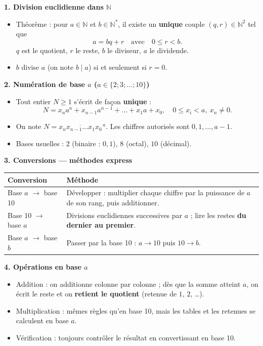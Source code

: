 \documentclass[11pt]{article}
\newcommand{\cle}[1]{{\popxbold\color{popdark}#1}}
\begin{document}
\begin{bilan}
\textbf{1. Division euclidienne dans $\mathbb{N}$}
\begin{itemize}
  \item \cle{Théorème} : pour $a\in\mathbb{N}$ et $b\in\mathbb{N}^*$, il existe un \textbf{unique} couple $(q,r)\in\mathbb{N}^2$ tel que
  \[ a=bq+r \quad\text{avec}\quad 0\leq r<b. \]
  $q$ est le \cle{quotient}, $r$ le \cle{reste}, $b$ le diviseur, $a$ le dividende.
  \item $b$ divise $a$ (on note $b\mid a$) si et seulement si $r=0$.
\end{itemize}

\textbf{2. Numération de base $a$ ($a\in\{2;3;\dots;10\}$)}
\begin{itemize}
  \item Tout entier $N\geq 1$ s'écrit de façon \textbf{unique} :
  \[ N=x_n a^n+x_{n-1}a^{n-1}+\dots+x_1 a+x_0,\quad 0\leq x_i<a,\ x_n\neq 0. \]
  \item On note $N=\overline{x_n x_{n-1}\dots x_1 x_0}^{\,a}$. Les \cle{chiffres} autorisés sont $0,1,\dots,a-1$.
  \item Bases usuelles : $2$ (binaire : $0,1$), $8$ (octal), $10$ (décimal).
\end{itemize}

\textbf{3. Conversions — méthodes express}
\begin{center}
\begin{tabularx}{\linewidth}{|l|X|}\hline
\rowcolor{popblueL} \textbf{Conversion} & \textbf{Méthode} \\ \hline
Base $a$ $\to$ base 10 & Développer : multiplier chaque chiffre par la puissance de $a$ de son rang, puis additionner. \\ \hline
Base 10 $\to$ base $a$ & Divisions euclidiennes successives par $a$ ; lire les restes \textbf{du dernier au premier}. \\ \hline
Base $a$ $\to$ base $b$ & Passer par la base 10 : $a\to 10$ puis $10\to b$. \\ \hline
\end{tabularx}
\end{center}

\textbf{4. Opérations en base $a$}
\begin{itemize}
  \item \cle{Addition} : on additionne colonne par colonne ; dès que la somme atteint $a$, on écrit le reste et on \textbf{retient le quotient} (retenue de $1$, $2$, \dots).
  \item \cle{Multiplication} : mêmes règles qu'en base 10, mais les tables et les retenues se calculent en base $a$.
  \item \cle{Vérification} : toujours contrôler le résultat en convertissant en base 10.
\end{itemize}
\end{bilan}
\end{document}
